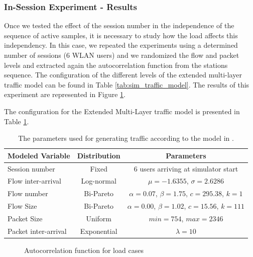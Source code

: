 \subsubsection{In-Session Experiment - Results} \label{subsec:autocorrelation_insessions}
Once we tested the effect of the session number in the independence of the sequence of active samples, it is necessary to study how the load affects this independency. In this case, we repeated the experiments using a determined number of sessions (6 \acs{WLAN} users) and we randomized the flow and packet levels and extracted again the autocorrelation function from the stations sequence. The configuration of the different levels of the extended multi-layer traffic model can be found in Table \ref{tab:sim_traffic_model}. The results of this experiment are represented in Figure \ref{fig:autocorrelation_insessions}.

The configuration for the Extended Multi-Layer traffic model is presented in Table \ref{tab:traffic_autocorrelation_active_load_gv}.

\begin{table}[h!]
	\begin{center}
		\begin{tabular}{ l | c | c }
			Modeled Variable & Distribution & Parameters \\ \hline
			Session number	& Fixed & 6 users arriving at simulator start \\
			Flow inter-arrival & Log-normal & $\mu = -1.6355$, $\sigma = 2.6286$ \\
			Flow number & Bi-Pareto & $\alpha = 0.07$, $\beta = 1.75$, $c = 295.38$, $k = 1$ \\
			Flow Size & Bi-Pareto & $\alpha = 0.00$, $\beta = 1.02$, $c = 15.56$, $k = 111$ \\
			Packet Size & Uniform & $min = 754$, $max = 2346$ \\
			Packet inter-arrival & Exponential & $\lambda = 10$ \\
		\end{tabular}
		\caption{The parameters used for generating traffic according to the model in \cite{Campus-WLAN}.}
		\label{tab:traffic_autocorrelation_active_load_gv}
	\end{center}
\end{table}

\begin{figure}[h!]
	\centering
	\caption{Autocorrelation function for load cases}
	\label{fig:autocorrelation_insessions}
\end{figure}


